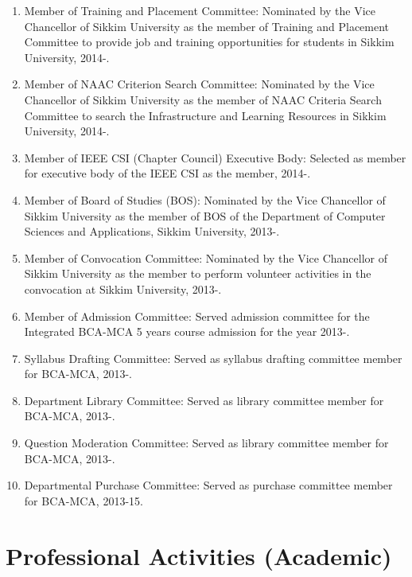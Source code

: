 \documentclass[11pt,a4paper]{moderncv}
\begin{document}
\begin{adjustwidth}{6em}{0pt}
\begin{enumerate}
		\item Member of Training and Placement Committee: Nominated by the Vice Chancellor of Sikkim University as the member of Training and Placement Committee to provide job and training opportunities for students in Sikkim University, 2014-.
		
		\item Member of NAAC Criterion Search Committee: Nominated by the Vice Chancellor of Sikkim University as the member of NAAC Criteria Search Committee to search the Infrastructure and Learning Resources in Sikkim University, 2014-.
		
		\item Member of IEEE CSI (Chapter Council) Executive Body: Selected as member for executive body of the IEEE CSI as the member, 2014-.
		
		\item Member of Board of Studies (BOS): Nominated by the Vice Chancellor of Sikkim University as the member of BOS of the Department of Computer Sciences and Applications, Sikkim University, 2013-.
		
		\item Member of Convocation Committee: Nominated by the Vice Chancellor of Sikkim University as the member to perform volunteer activities in the convocation at Sikkim University, 2013-.
		
		\item Member of Admission Committee: Served admission committee for the Integrated BCA-MCA 5 years course admission for the year 2013-.
		
		\item Syllabus Drafting Committee: Served as syllabus drafting committee member for BCA-MCA, 2013-.
		
		\item Department Library Committee: Served as library committee member for BCA-MCA, 2013-.
		
		\item Question Moderation Committee: Served as library committee member for BCA-MCA, 2013-.
		
		\item Departmental Purchase Committee: Served as purchase committee member for BCA-MCA, 2013-15.
		
	\end{enumerate}
\end{adjustwidth}


\section{\textbf{Professional Activities (Academic)}}
\end{document}
